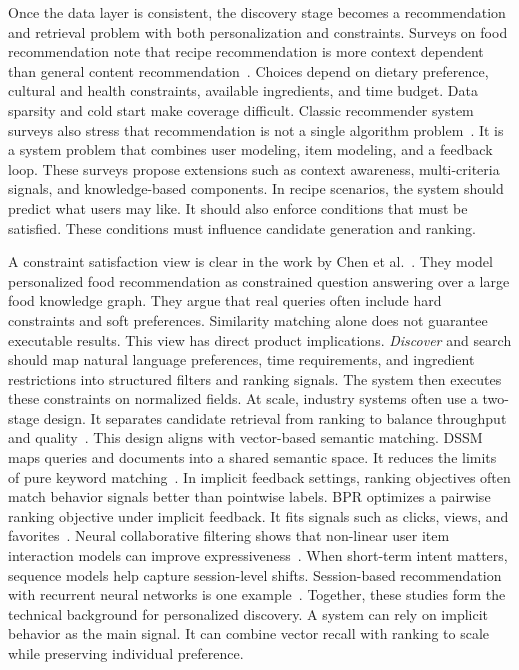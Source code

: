 \documentclass[journal]{IEEEtran}
\begin{document}
Once the data layer is consistent, the discovery stage becomes a recommendation and retrieval problem with both personalization and constraints. Surveys on food recommendation note that recipe recommendation is more context dependent than general content recommendation~\cite{trattner2017food_recommender_systems}. Choices depend on dietary preference, cultural and health constraints, available ingredients, and time budget. Data sparsity and cold start make coverage difficult. Classic recommender system surveys also stress that recommendation is not a single algorithm problem~\cite{adomavicius2005next_generation_rs}. It is a system problem that combines user modeling, item modeling, and a feedback loop. These surveys propose extensions such as context awareness, multi-criteria signals, and knowledge-based components. In recipe scenarios, the system should predict what users may like. It should also enforce conditions that must be satisfied. These conditions must influence candidate generation and ranking.

A constraint satisfaction view is clear in the work by Chen et al.~\cite{chen2021personalized_food_kbqa}. They model personalized food recommendation as constrained question answering over a large food knowledge graph. They argue that real queries often include hard constraints and soft preferences. Similarity matching alone does not guarantee executable results. This view has direct product implications. \textit{Discover} and search should map natural language preferences, time requirements, and ingredient restrictions into structured filters and ranking signals. The system then executes these constraints on normalized fields. At scale, industry systems often use a two-stage design. It separates candidate retrieval from ranking to balance throughput and quality~\cite{covington2016youtube_dnn_recs}. This design aligns with vector-based semantic matching. DSSM maps queries and documents into a shared semantic space. It reduces the limits of pure keyword matching~\cite{huang2013dssm}. In implicit feedback settings, ranking objectives often match behavior signals better than pointwise labels. BPR optimizes a pairwise ranking objective under implicit feedback. It fits signals such as clicks, views, and favorites~\cite{rendle2009bpr}. Neural collaborative filtering shows that non-linear user item interaction models can improve expressiveness~\cite{he2017neural_collaborative_filtering}. When short-term intent matters, sequence models help capture session-level shifts. Session-based recommendation with recurrent neural networks is one example~\cite{hidasi2015session_rnn}. Together, these studies form the technical background for personalized discovery. A system can rely on implicit behavior as the main signal. It can combine vector recall with ranking to scale while preserving individual preference.
\end{document}
